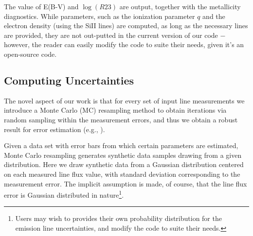 \documentclass{emulateapj}
\begin{document}
The value of E(B-V) and $\log(R23)$ are output, together with the metallicity diagnostics. While parameters, such as the ionization parameter $q$ and the electron density (using the SiII lines) are computed, as long as the necessary lines are provided, they are not out-putted in the current version of our code $-$ however, the reader can easily modify the code to suite their needs, given it's an open-source code.



\subsection{Computing Uncertainties}
The novel aspect of our work is that for every set of input line measurements we introduce a Monte Carlo (MC) resampling method to obtain iterations via random sampling within the measurement errors, and thus we obtain a robust result for error estimation (e.g., \citealt{efron79,hastie09,andrae10}). 

Given a data set with error bars from which certain parameters are estimated, Monte Carlo resampling generates synthetic data samples drawing from a given distribution. 
Here we draw synthetic data from a Gaussian distribution centered on each measured line flux value, with standard deviation corresponding to the measurement error. The implicit assumption is made, of course, that the line flux error is Gaussian distributed in nature\footnote{Users may wish to provides their own probability distribution for the emission line uncertainties, and modify the code to suite their needs.}. 
\end{document}
